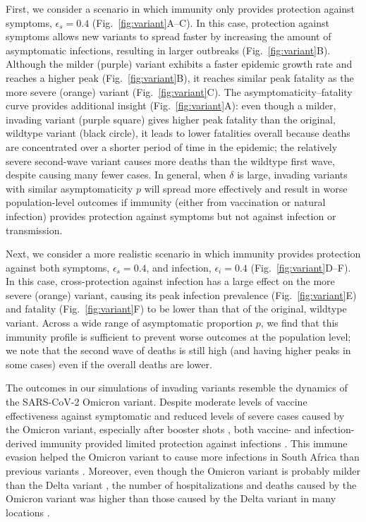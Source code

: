 \documentclass[12pt]{article}
\newcommand{\fref}[1]{Fig.~\ref{fig:#1}}
\begin{document}
First, we consider a scenario in which immunity only provides protection against symptoms, $\epsilon_s = 0.4$ (\fref{variant}A--C).
In this case, protection against symptoms allows new variants to spread faster by increasing the amount of asymptomatic infections, resulting in larger outbreaks (\fref{variant}B).
Although the milder (purple) variant exhibits a faster epidemic growth rate and reaches a higher peak (\fref{variant}B), it reaches similar peak fatality as the more severe (orange) variant (\fref{variant}C).
The asymptomaticity--fatality curve provides additional insight (\fref{variant}A): even though a milder, invading variant (purple square) gives higher peak fatality than the original, wildtype variant (black circle), it leads to lower fatalities overall because deaths are concentrated over a shorter period of time in the epidemic; the relatively severe second-wave variant causes more deaths than the wildtype first wave, despite causing many fewer cases.
In general, when $\delta$ is large, invading variants with similar asymptomaticity $p$ will spread more effectively and result in worse population-level outcomes if immunity (either from vaccination or natural infection) provides protection against symptoms but not against infection or transmission.

Next, we consider a more realistic scenario in which immunity provides protection against both symptoms, $\epsilon_s = 0.4$, and infection, $\epsilon_i = 0.4$ (\fref{variant}D--F).
In this case, cross-protection against infection has a large effect on the more severe (orange) variant, causing its peak infection prevalence (\fref{variant}E) and fatality (\fref{variant}F) to be lower than that of the original, wildtype variant.
Across a wide range of asymptomatic proportion $p$, we find that this immunity profile is sufficient to prevent worse outcomes at the population level;
we note that the second wave of deaths is still high (and having higher peaks in some cases) even if the overall deaths are lower.

The outcomes in our simulations of invading variants resemble the dynamics of the SARS-CoV-2 Omicron variant.
Despite moderate levels of vaccine effectiveness against symptomatic and reduced levels of severe cases caused by the Omicron variant, especially after booster shots \cite{andres2022omicron}, both vaccine- and infection-derived immunity provided limited protection against infections \cite{pearson2021omicron}.
This immune evasion helped the Omicron variant to cause more infections in South Africa than previous variants \cite{sun2022omicron}.
Moreover, even though the Omicron variant is probably milder than the Delta variant \cite{MENNI20221618,ulloa2022estimates}, the number of hospitalizations and deaths caused by the Omicron variant was higher than those caused by the Delta variant in many locations \cite{Iacobuccio254,faust2022omicron,sigal2022estimating}.
\end{document}
